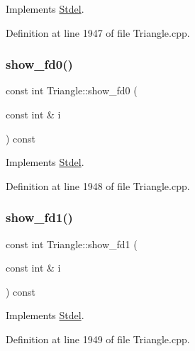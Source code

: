 Implements \hyperlink{classStdel_ae76b0893dabd93ae9f86a9ed445852ba}{Stdel}.



Definition at line 1947 of file Triangle.\+cpp.

\mbox{\label{classTriangle_a715ce8022208f6b23e980acced093e99}} 
\subsubsection{\texorpdfstring{show\+\_\+fd0()}{show\_fd0()}}
{\footnotesize\ttfamily const int Triangle\+::show\+\_\+fd0 (\begin{DoxyParamCaption}\item[{const int \&}]{i }\end{DoxyParamCaption}) const\hspace{0.3cm}{\ttfamily [virtual]}}



Implements \hyperlink{classStdel_a0e05ccae64925915af5f07c91d61c7bc}{Stdel}.



Definition at line 1948 of file Triangle.\+cpp.

\mbox{\label{classTriangle_a3635411b31e3fe7dbe226efe5de45094}} 
\subsubsection{\texorpdfstring{show\+\_\+fd1()}{show\_fd1()}}
{\footnotesize\ttfamily const int Triangle\+::show\+\_\+fd1 (\begin{DoxyParamCaption}\item[{const int \&}]{i }\end{DoxyParamCaption}) const\hspace{0.3cm}{\ttfamily [virtual]}}



Implements \hyperlink{classStdel_af4a394fae421489159f40ddcb736353b}{Stdel}.



Definition at line 1949 of file Triangle.\+cpp.

\mbox{\label{classTriangle_a89169103df31e2cbe4383617363e48de}} 
